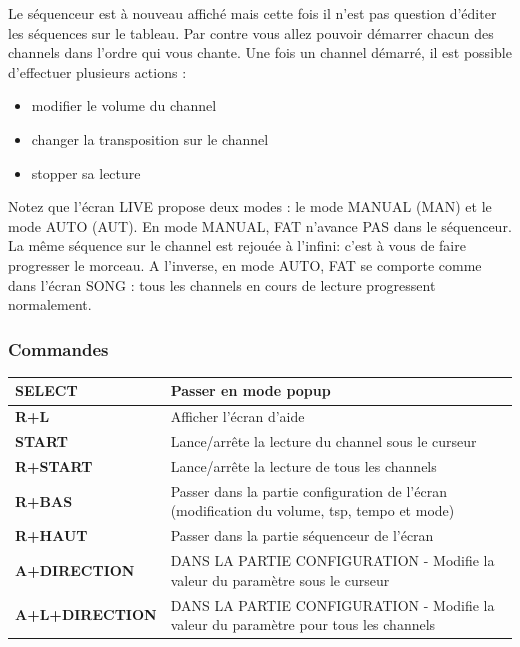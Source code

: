 \documentclass[12pt,a4paper]{article}
\begin{document}

    Le séquenceur est à nouveau affiché mais cette fois il n'est pas question d'éditer les séquences sur le tableau.
    Par contre vous allez pouvoir démarrer chacun des channels dans l'ordre qui vous chante.
    Une fois un channel démarré, il est possible d'effectuer plusieurs actions :
    \medskip

    \begin{itemize}
        \item{modifier le volume du channel}
        \item{changer la transposition sur le channel}
        \item{stopper sa lecture}
    \end{itemize}
    \medskip

    Notez que l'écran LIVE propose deux modes : le mode MANUAL (MAN) et le mode AUTO (AUT).
    En mode MANUAL, FAT n'avance PAS dans le séquenceur. La même séquence sur le channel est rejouée à l'infini: c'est à vous de faire progresser le morceau.
    A l'inverse, en mode AUTO, FAT se comporte comme dans l'écran SONG : tous les channels en cours de lecture progressent normalement.
    \newpage %
    \subsubsection{Commandes}
    \begin{supertabular}{|l|p{10cm}|}
        \hline
        {\bf SELECT} & Passer en mode popup \\
        \hline
        {\bf R+L} & Afficher l'écran d'aide \\
        \hline
        {\bf START} & Lance/arrête la lecture du channel sous le curseur \\
        \hline
        {\bf R+START} & Lance/arrête la lecture de tous les channels \\
        \hline
        {\bf R+BAS} & Passer dans la partie configuration de l'écran (modification du volume, tsp, tempo et mode) \\
        \hline
        {\bf R+HAUT} & Passer dans la partie séquenceur de l'écran \\
        \hline
        {\bf A+DIRECTION} & DANS LA PARTIE CONFIGURATION - Modifie la valeur du paramètre sous le curseur \\
        \hline
        {\bf A+L+DIRECTION} & DANS LA PARTIE CONFIGURATION - Modifie la valeur du paramètre pour tous les channels \\
        \hline
    \end{supertabular}
\end{document}
